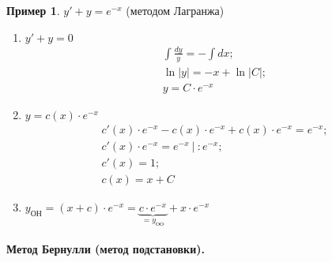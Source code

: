 \documentclass[11pt,a4paper,oneside]{report}
\theoremstyle{definition}
\newtheorem{example}{Пример}
\theoremstyle{plain}
\theoremstyle{remark}
\begin{document}
\begin{example}
    $y' + y = e^{-x}$ (методом Лагранжа)
    \begin{enumerate}
        \item $y' + y = 0$
              \begin{align*}
                  \int \frac{dy}{y} = -\int dx; \\
                  \ln|y| = -x + \ln |C|;        \\
                  y = C\cdot e^{-x}
              \end{align*}
        \item $y = c(x)\cdot e^{-x}$
              \begin{align*}
                  c'(x)\cdot e^{-x} - c(x)\cdot e^{-x} + c(x)\cdot e^{-x} = e^{-x}; \\
                  c'(x)\cdot e^{-x} = e^{-x} \ \Big| \ :e^{-x};                     \\
                  c'(x) = 1;                                                        \\
                  c(x) = x + C
              \end{align*}
        \item $y_\text{ОН} = (x+c)\cdot e^{-x} = \underbrace{c\cdot e^{-x}}_{=y_\text{ОО}} + x\cdot e^{-x}$
    \end{enumerate}
\end{example}

\paragraph*{Метод Бернулли (метод подстановки).}
\end{document}
